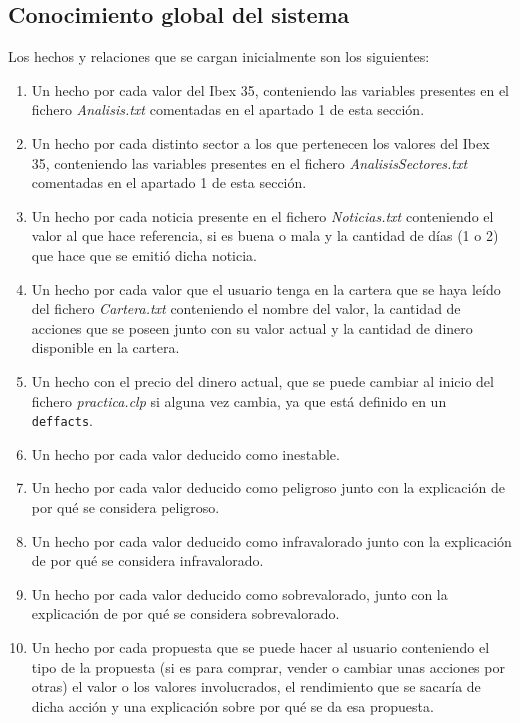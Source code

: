 \documentclass[12pt]{article}
\begin{document}
\subsection{Conocimiento global del sistema}
Los hechos y relaciones que se cargan inicialmente son los siguientes:
\begin{enumerate}
\item Un hecho por cada valor del Ibex 35, conteniendo las variables presentes en el fichero \textit{Analisis.txt} comentadas en el apartado 1 de esta sección.
\item Un hecho por cada distinto sector a los que pertenecen los valores del Ibex 35, conteniendo las variables presentes en el fichero \textit{AnalisisSectores.txt} comentadas en el apartado 1 de esta sección.
\item Un hecho por cada noticia presente en el fichero \textit{Noticias.txt} conteniendo el valor al que hace referencia, si es buena o mala y la cantidad de días (1 o 2) que hace que se emitió dicha noticia.
\item Un hecho por cada valor que el usuario tenga en la cartera que se haya leído del fichero \textit{Cartera.txt} conteniendo el nombre del valor, la cantidad de acciones que se poseen junto con su valor actual y la cantidad de dinero disponible en la cartera.
\item Un hecho con el precio del dinero actual, que se puede cambiar al inicio del fichero \textit{practica.clp} si alguna vez cambia, ya que está definido en un \texttt{deffacts}.
\item Un hecho por cada valor deducido como inestable.
\item Un hecho por cada valor deducido como peligroso junto con la explicación de por qué se considera peligroso.
\item Un hecho por cada valor deducido como infravalorado junto con la explicación de por qué se considera infravalorado.
\item Un hecho por cada valor deducido como sobrevalorado, junto con la explicación de por qué se considera sobrevalorado.
\item Un hecho por cada propuesta que se puede hacer al usuario conteniendo el tipo de la propuesta (si es para comprar, vender o cambiar unas acciones por otras) el valor o los valores involucrados, el rendimiento que se sacaría de dicha acción y una explicación sobre por qué se da esa propuesta.
\end{enumerate}
\end{document}
